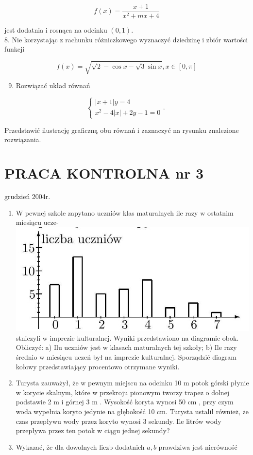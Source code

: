 \documentclass[10pt]{article}
\begin{document}
$$
f(x)=\frac{x+1}{x^{2}+m x+4}
$$

jest dodatnia i rosnąca na odcinku $(0,1)$.\\
8. Nie korzystając z rachunku różniczkowego wyznaczyć dziedzinę i zbiór wartości funkcji

$$
f(x)=\sqrt{\sqrt{2}-\cos x-\sqrt{3} \sin x}, x \in[0, \pi]
$$

\begin{enumerate}
  \setcounter{enumi}{8}
  \item Rozwiązać układ równań
\end{enumerate}

$$
\left\{\begin{array}{r}
|x+1| y=4 \\
x^{2}-4|x|+2 y-1=0
\end{array}\right. \text {. }
$$

Przedstawić ilustrację graficzną obu równań i zaznaczyć na rysunku znalezione rozwiązania.

\section*{PRACA KONTROLNA nr 3}
grudzień 2004r.

\begin{enumerate}
  \item W pewnej szkole zapytano uczniów klas maturalnych ile razy w ostatnim miesiącu ucze-\\
\includegraphics[max width=\textwidth, center]{2024_11_16_8518088a6e381b1443b2g-3(1)}\\
stniczyli w imprezie kulturalnej. Wyniki przedstawiono na diagramie obok. Obliczyć: a) Ilu uczniów jest w klasach maturalnych tej szkoły; b) Ile razy średnio w miesiącu uczeń był na imprezie kulturalnej. Sporządzić diagram kołowy przedstawiający procentowo otrzymane wyniki.
  \item Turysta zauważył, że w pewnym miejscu na odcinku 10 m potok górski płynie w korycie skalnym, które w przekroju pionowym tworzy trapez o dolnej podstawie 2 m i górnej 3 m . Wysokość koryta wynosi 50 cm , przy czym woda wypełnia koryto jedynie na głębokość 10 cm. Turysta ustalił również, że czas przepływu wody przez koryto wynosi 3 sekundy. Ile litrów wody przepływa przez ten potok w ciągu jednej sekundy?
  \item Wykazać, że dla dowolnych liczb dodatnich $a, b$ prawdziwa jest nierówność
\end{enumerate}
\end{document}
